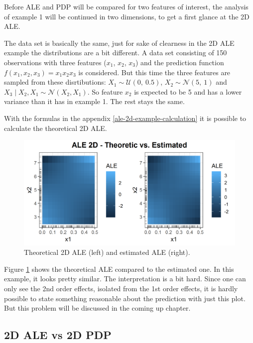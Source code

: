 \documentclass[]{krantz}
\begin{document}
Before ALE and PDP will be compared for two features of interest, the
analysis of example 1 will be continued in two dimensions, to get a
first glance at the 2D ALE.

The data set is basically the same, just for sake of clearness in the 2D
ALE example the distributions are a bit different. A data set consisting
of 150 observations with three features (\(x_1\), \(x_2\), \(x_3\)) and
the prediction function \(f(x_1, x_2, x_3) = x_1 x_2 x_3\) is
considered. But this time the three features are sampled from these
disrtibutions: \(X_1 \sim \mathcal{U}(0,~0.5)\),
\(X_2 \sim \mathcal{N}(5,~1)\) and
\(X_3\mid X_2, X_1 \sim \mathcal{N}(X_2,X_1)\). So feature \(x_2\) is
expected to be 5 and has a lower variance than it has in example 1. The
rest stays the same.

With the formulas in the appendix \ref{ale-2d-example-calculation} it is
possible to calculate the theoretical 2D ALE.

\begin{figure}
\includegraphics[width=1\linewidth]{images/ale_1_ALE_2D_theo_vs_estim_x1x2x3_150_0_0p5_5_1} \caption{Theoretical 2D ALE (left) and estimated ALE (right).}\label{fig:theo2Dale}
\end{figure}



Figure \ref{fig:theo2Dale} shows the theoretical ALE compared to the
estimated one. In this example, it looks pretty similar. The
interpretation is a bit hard. Since one can only see the 2nd order
effects, isolated from the 1st order effects, it is hardly possible to
state something reasonable about the prediction with just this plot. But
this problem will be discussed in the coming up chapter.

\subsection{2D ALE vs 2D PDP}\label{d-ale-vs-2d-pdp}
\end{document}
